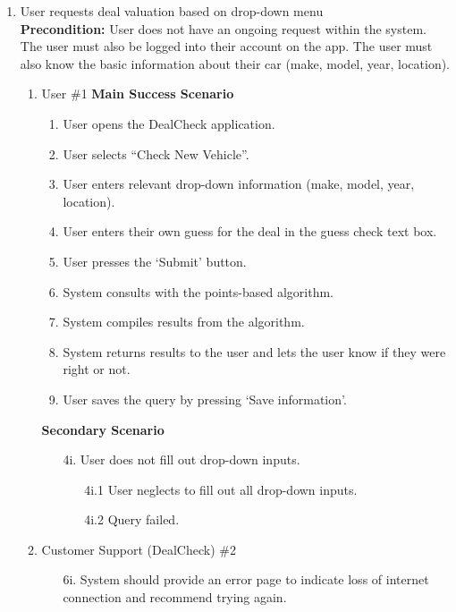 \documentclass[]{article}
\begin{document}
\begin{enumerate}[{\bf {BE}1.}]

    \item User requests deal valuation based on drop-down menu \\    
	\textbf{Precondition:} User does not have an ongoing request within the system. The user must also be logged into their account on the app. The user must also know the basic information about their car (make, model, year, location).
    \begin{enumerate}[{\bf VP1.}]
      \item User \#1
        \textbf{Main Success Scenario}
        \begin{enumerate}[1.]
          \item User opens the DealCheck application.
          \item User selects “Check New Vehicle”.
          \item User enters relevant drop-down information (make, model, year, location).
          \item User enters their own guess for the deal in the guess check text box.
          \item User presses the ‘Submit’ button.
          \item System consults with the points-based algorithm.
          \item System compiles results from the algorithm.
          \item System returns results to the user and lets the user know if they were right or not.
          \item User saves the query by pressing ‘Save information’.
        \end{enumerate}
        \textbf{Secondary Scenario}
        \begin{enumerate}
          \item[4i.] User does not fill out drop-down inputs.
          \begin{enumerate}
            \item[4i.1] User neglects to fill out all drop-down inputs.
            \item[4i.2] Query failed.
          \end{enumerate}
        \end{enumerate}
      \item Customer Support (DealCheck) \#2
        \begin{enumerate}
          \item[6i.] System should provide an error page to indicate loss of internet connection and recommend trying again.

\end{enumerate}
\end{enumerate}
\end{enumerate}
\end{document}

